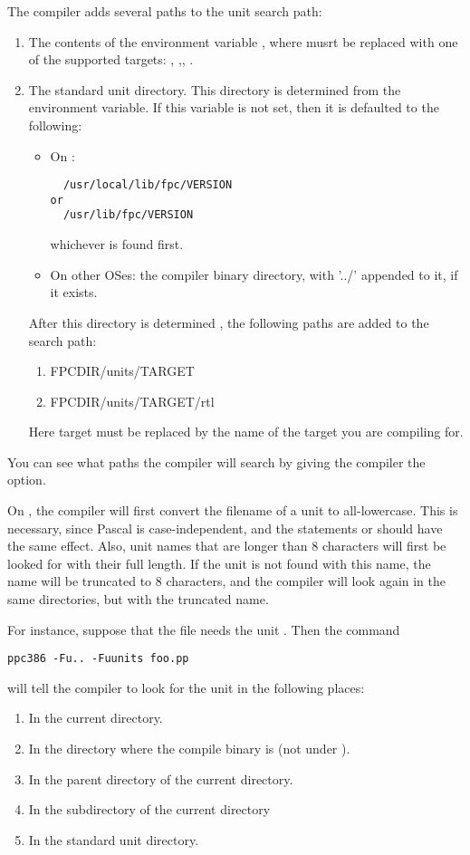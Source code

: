 \documentclass{report}
\begin{document}
The compiler adds several paths to the unit search path:
\begin{enumerate}
\item The contents of the environment variable , where 
musrt be replaced with one of the supported targets: ,
,, .
\item The standard unit directory. This directory is determined
from the  environment variable. If this variable is not set,
then it is defaulted to the following:
\begin{itemize}
\item On \linux:
\begin{verbatim}
  /usr/local/lib/fpc/VERSION
or
  /usr/lib/fpc/VERSION
\end{verbatim}
whichever is found first.
\item On other OSes: the compiler binary directory, with '../' appended
to it, if it exists.
\end{itemize}
After this directory is determined , the following paths are added to the
search path:
\begin{enumerate}
\item FPCDIR/units/TARGET
\item FPCDIR/units/TARGET/rtl
\end{enumerate}
Here target must be replaced by the name of the target you are compiling for.
\end{enumerate}
You can see what paths the compiler will search by giving the compiler
the  option.

On \linux, the compiler will first convert the filename of a unit to
all-lowercase. This is necessary, since Pascal is case-independent, and
the statements  or  should have the same
effect.
Also, unit names that are longer than 8 characters will first be looked for
with their full length. If the unit is not found with this name, the name
will be truncated to 8 characters, and the compiler will look again in the
same directories, but with the truncated name.

For instance, suppose that the file  needs the unit
. Then the command
\begin{verbatim}
ppc386 -Fu.. -Fuunits foo.pp
\end{verbatim}
will tell the compiler to look for the unit  in the following
places:
\begin{enumerate}
\item In the current directory.
\item In the directory where the compile binary is (not under \linux).
\item In the parent directory of the current directory.
\item In the subdirectory  of the current directory
\item In the standard unit directory.
\end{enumerate}
\end{document}
